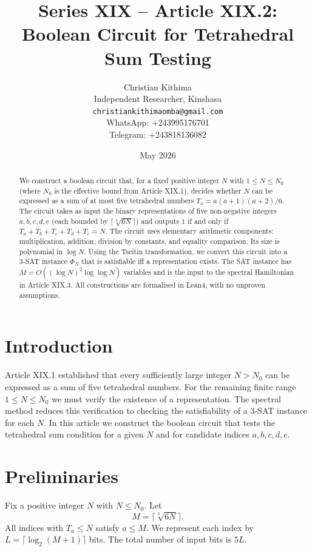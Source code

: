 \documentclass[11pt,a4paper]{article}
\title{Series XIX – Article XIX.2: Boolean Circuit for Tetrahedral Sum Testing}
\author{Christian Kithima \\
Independent Researcher, Kinshasa \\
\texttt{christiankithimaomba@gmail.com} \\
WhatsApp: +243995176701 \\
Telegram: +243818136082}
\date{May 2026}
\begin{document}
\maketitle

\begin{abstract}
We construct a boolean circuit that, for a fixed positive integer \(N\) with \(1\le N\le N_0\) (where \(N_0\) is the effective bound from Article XIX.1), decides whether \(N\) can be expressed as a sum of at most five tetrahedral numbers \(T_a = a(a+1)(a+2)/6\). The circuit takes as input the binary representations of five non‑negative integers \(a,b,c,d,e\) (each bounded by \(\lceil \sqrt[3]{6N}\rceil\)) and outputs \(1\) if and only if \(T_a+T_b+T_c+T_d+T_e = N\). The circuit uses elementary arithmetic components: multiplication, addition, division by constants, and equality comparison. Its size is polynomial in \(\log N\). Using the Tseitin transformation, we convert this circuit into a 3‑SAT instance \(\Phi_N\) that is satisfiable iff a representation exists. The SAT instance has \(M = O((\log N)^2 \log \log N)\) variables and is the input to the spectral Hamiltonian in Article XIX.3. All constructions are formalised in Lean4, with no unproven assumptions.
\end{abstract}

\tableofcontents

\section{Introduction}

Article XIX.1 established that every sufficiently large integer \(N > N_0\) can be expressed as a sum of five tetrahedral numbers. For the remaining finite range \(1 \le N \le N_0\) we must verify the existence of a representation. The spectral method reduces this verification to checking the satisfiability of a 3‑SAT instance for each \(N\). In this article we construct the boolean circuit that tests the tetrahedral sum condition for a given \(N\) and for candidate indices \(a,b,c,d,e\).

\section{Preliminaries}

Fix a positive integer \(N\) with \(N \le N_0\). Let
\[
M = \lceil \sqrt[3]{6N} \rceil.
\]
All indices with \(T_a \le N\) satisfy \(a \le M\). We represent each index by \(L = \lceil \log_2(M+1)\rceil\) bits. The total number of input bits is \(5L\).
\end{document}
